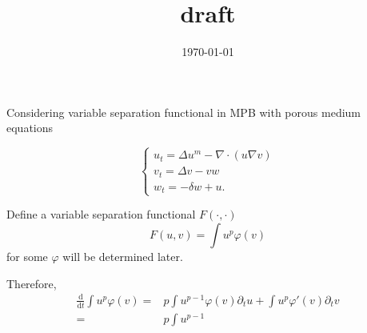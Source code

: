 \documentclass[12pt,]{article}
\title{draft}
\date{\today}
\begin{document}
\maketitle

Considering variable separation functional in MPB with porous medium equations

\begin{equation}
\left\{\begin{array}{l}
u_{t}=\Delta u^m-\nabla \cdot(u \nabla v) \\
v_{t}=\Delta v-v w \\
w_{t}=-\delta w+u.
\end{array}\right.
\end{equation}

Define a variable separation functional $F(\cdot,\cdot)$ 
\begin{equation}
F(u,v) = \int u^{p} \varphi(v)
\end{equation}
for some $\varphi$ will be determined later.

Therefore, 
\begin{equation}
\begin{aligned}
\frac{\mathrm{d}}{\mathrm{d} t} \int u^{p} \varphi(v)=&p\int u^{p-1}\varphi(v)\partial_t u  + \int u^p\varphi'(v)\partial_tv\\
=&p\int u^{p-1}
\end{aligned}
\end{equation}



% 
\end{document}

